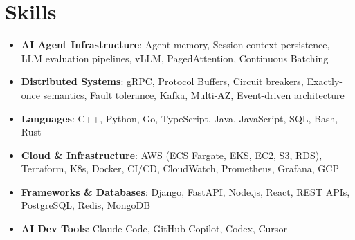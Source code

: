 \documentclass[letterpaper,11pt]{article}
\newcommand{\resumeSubHeadingListStart}{\begin{itemize}[leftmargin=0.15in, label={}]}
\newcommand{\resumeSubHeadingListEnd}{\end{itemize}}
\newcommand{\resumeSkillHeading}[2]{%
  \item\small{\textbf{#1}: #2 \vspace{-9pt}}%
}
\begin{document}
\section{Skills}
  \resumeSubHeadingListStart
    \resumeSkillHeading{AI Agent Infrastructure}{Agent memory, Session-context persistence, LLM evaluation pipelines, vLLM, PagedAttention, Continuous Batching}
    \resumeSkillHeading{Distributed Systems}{gRPC, Protocol Buffers, Circuit breakers, Exactly-once semantics, Fault tolerance, Kafka, Multi-AZ, Event-driven architecture}
    \resumeSkillHeading{Languages}{C++, Python, Go, TypeScript, Java, JavaScript, SQL, Bash, Rust}
    \resumeSkillHeading{Cloud \& Infrastructure}{AWS (ECS Fargate, EKS, EC2, S3, RDS), Terraform, K8s, Docker, CI/CD, CloudWatch, Prometheus, Grafana, GCP}
    \resumeSkillHeading{Frameworks \& Databases}{Django, FastAPI, Node.js, React, REST APIs, PostgreSQL, Redis, MongoDB}
    \resumeSkillHeading{AI Dev Tools}{Claude Code, GitHub Copilot, Codex, Cursor}
  \resumeSubHeadingListEnd
\end{document}
